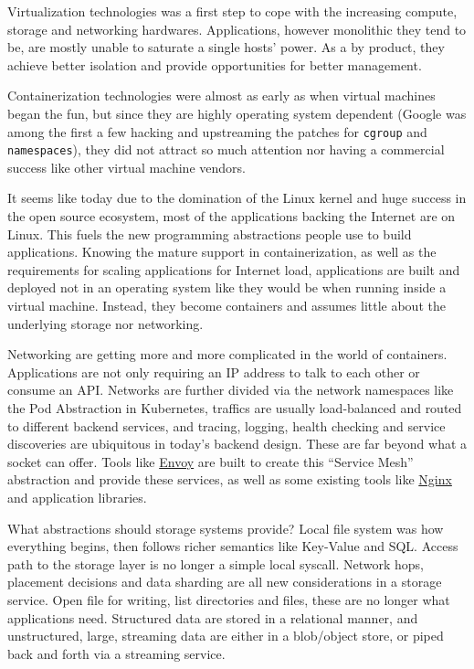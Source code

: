 Virtualization technologies was a first step to cope with the increasing
compute, storage and networking hardwares. Applications, however monolithic
they tend to be, are mostly unable to saturate a single hosts' power. As a by
product, they achieve better isolation and provide opportunities for better
management.

Containerization technologies were almost as early as when virtual machines
began the fun, but since they are highly operating system dependent (Google
was among the first a few hacking and upstreaming the patches for \texttt{cgroup}
and \texttt{namespaces}), they did not attract so much attention nor having a
commercial success like other virtual machine vendors.

It seems like today due to the domination of the Linux kernel and huge
success in the open source ecosystem, most of the applications backing the
Internet are on Linux. This fuels the new programming abstractions people use
to build applications. Knowing the mature support in containerization, as
well as the requirements for scaling applications for Internet load,
applications are built and deployed not in an operating system like they
would be when running inside a virtual machine. Instead, they become
containers and assumes little about the underlying storage nor networking.

Networking are getting more and more complicated in the world of containers.
Applications are not only requiring an IP address to talk to each other or
consume an API. Networks are further divided via the network namespaces like
the Pod Abstraction in Kubernetes, traffics are usually load-balanced and
routed to different backend services, and tracing, logging, health checking
and service discoveries are ubiquitous in today's backend design. These are
far beyond what a socket can offer. Tools like
\href{https://www.envoyproxy.io/}{Envoy} are built to create this ``Service
Mesh'' abstraction and provide these services, as well as some existing tools
like
\href{https://www.nginx.com/resources/glossary/layer-7-load-balancing/}{Nginx}
and application libraries.

What abstractions should storage systems provide? Local file system was how
everything begins, then follows richer semantics like Key-Value and SQL.
Access path to the storage layer is no longer a simple local syscall. Network
hops, placement decisions and data sharding are all new considerations in a
storage service. Open file for writing, list directories and files, these are
no longer what applications need. Structured data are stored in a relational
manner, and unstructured, large, streaming data are either in a blob/object
store, or piped back and forth via a streaming service.

\notesep
